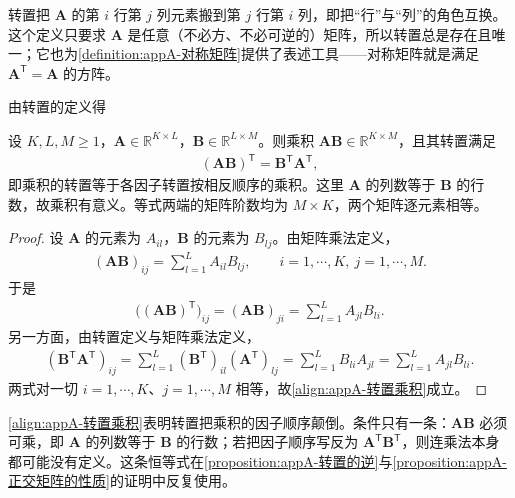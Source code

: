 \documentclass[../main.tex]{subfiles}
\begin{document}
\begin{remark}
转置把 $\bm{A}$ 的第 $i$ 行第 $j$ 列元素搬到第 $j$ 行第 $i$ 列，即把“行”与“列”的角色互换。这个定义只要求 $\bm{A}$ 是任意（不必方、不必可逆的）矩阵，所以转置总是存在且唯一；它也为\cref{definition:appA-对称矩阵}提供了表述工具——对称矩阵就是满足 $\bm{A}^{\mathsf{T}}=\bm{A}$ 的方阵。
\end{remark}

由转置的定义得
\begin{proposition}[乘积的转置]\label{proposition:appA-乘积的转置}
设 $K,L,M\geqslant1$，$\bm{A}\in\mathbb{R}^{K\times L}$，$\bm{B}\in\mathbb{R}^{L\times M}$。则乘积 $\bm{A}\bm{B}\in\mathbb{R}^{K\times M}$，且其转置满足
\begin{align}
  (\bm{A}\bm{B})^{\mathsf{T}}=\bm{B}^{\mathsf{T}}\bm{A}^{\mathsf{T}},
  \label{align:appA-转置乘积}
\end{align}
即乘积的转置等于各因子转置按相反顺序的乘积。这里 $\bm{A}$ 的列数等于 $\bm{B}$ 的行数，故乘积有意义。等式两端的矩阵阶数均为 $M\times K$，两个矩阵逐元素相等。
\end{proposition}

\begin{proof}
设 $\bm{A}$ 的元素为 $A_{il}$，$\bm{B}$ 的元素为 $B_{lj}$。由矩阵乘法定义，
\begin{align*}
 (\bm{A}\bm{B})_{ij}=\sum_{l=1}^{L}A_{il}B_{lj},\qquad i=1,\cdots,K,\ j=1,\cdots,M.
\end{align*}
于是
\begin{align*}
 \bigl((\bm{A}\bm{B})^{\mathsf{T}}\bigr)_{ij}=(\bm{A}\bm{B})_{ji}=\sum_{l=1}^{L}A_{jl}B_{li}.
\end{align*}
另一方面，由转置定义与矩阵乘法定义，
\begin{align*}
 (\bm{B}^{\mathsf{T}}\bm{A}^{\mathsf{T}})_{ij}=\sum_{l=1}^{L}(\bm{B}^{\mathsf{T}})_{il}(\bm{A}^{\mathsf{T}})_{lj}=\sum_{l=1}^{L}B_{li}A_{jl}=\sum_{l=1}^{L}A_{jl}B_{li}.
\end{align*}
两式对一切 $i=1,\cdots,K$、$j=1,\cdots,M$ 相等，故\eqref{align:appA-转置乘积}成立。
\end{proof}

\begin{remark}
\eqref{align:appA-转置乘积}表明转置把乘积的因子顺序颠倒。条件只有一条：$\bm{A}\bm{B}$ 必须可乘，即 $\bm{A}$ 的列数等于 $\bm{B}$ 的行数；若把因子顺序写反为 $\bm{A}^{\mathsf{T}}\bm{B}^{\mathsf{T}}$，则连乘法本身都可能没有定义。这条恒等式在\cref{proposition:appA-转置的逆}与\cref{proposition:appA-正交矩阵的性质}的证明中反复使用。
\end{remark}
\end{document}
